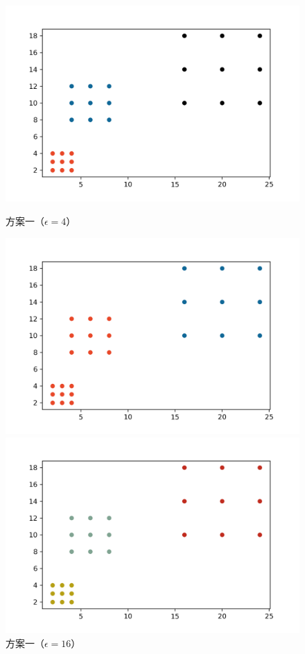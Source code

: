 \begin{figure}[htbp] %
	\begin{minipage}[t]{0.33\linewidth}
		\includegraphics[width=\linewidth]{img/dbhc-exp-1.png}
		\caption{方案一（$ \epsilon = 4 $）}
		\label{dbhcexp1}
	\end{minipage}%
	\hfill%
	\begin{minipage}[t]{0.33\linewidth}
		\includegraphics[width=\linewidth]{img/dbhc-exp-2.png}
		\caption{方案一（$ \epsilon = 16 $）}
		\label{dbhcexp2}
	\end{minipage}
	\hfill
	\begin{minipage}[t]{0.33\linewidth}
		\includegraphics[width=\linewidth]{img/dbhc-exp-3.png}

\end{minipage}
\end{figure}
